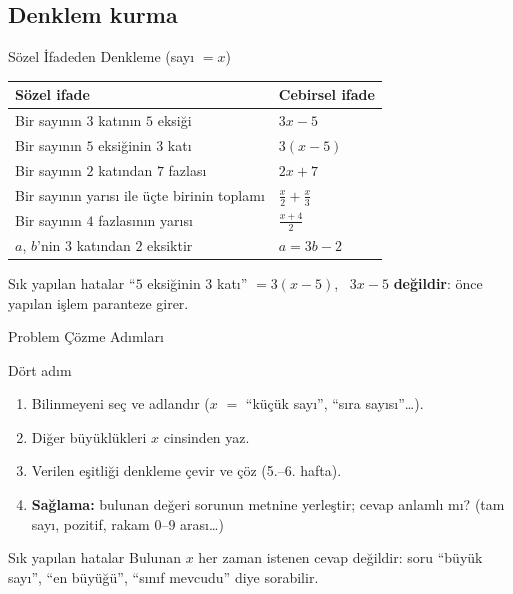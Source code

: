 \documentclass[aspectratio=169,11pt]{beamer}
\begin{document}
\subsection{Denklem kurma}
\begin{frame}{Sözel İfadeden Denkleme (sayı \(=x\))}
\begin{center}
\renewcommand{\arraystretch}{1.35}
\begin{tabular}{ll}
\toprule
Sözel ifade & Cebirsel ifade\\\midrule
Bir sayının \(3\) katının \(5\) eksiği & \(3x-5\)\\
Bir sayının \(5\) eksiğinin \(3\) katı & \(3(x-5)\)\\
Bir sayının \(2\) katından \(7\) fazlası & \(2x+7\)\\
Bir sayının yarısı ile üçte birinin toplamı & \(\tfrac{x}{2}+\tfrac{x}{3}\)\\
Bir sayının \(4\) fazlasının yarısı & \(\tfrac{x+4}{2}\)\\
\(a\), \(b\)'nin \(3\) katından \(2\) eksiktir & \(a=3b-2\)\\\bottomrule
\end{tabular}
\end{center}
\begin{alertblock}{Sık yapılan hatalar}
``\(5\) eksiğinin \(3\) katı'' \(=3(x-5)\), \ \(3x-5\) \textbf{değildir}: önce yapılan işlem paranteze girer.
\end{alertblock}
\end{frame}

\begin{frame}{Problem Çözme Adımları}
\begin{block}{Dört adım}
\begin{enumerate}
\item Bilinmeyeni seç ve adlandır (\(x\) \(=\) ``küçük sayı'', ``sıra sayısı''\dots).
\item Diğer büyüklükleri \(x\) cinsinden yaz.
\item Verilen eşitliği denkleme çevir ve çöz (5.--6. hafta).
\item \textbf{Sağlama:} bulunan değeri sorunun metnine yerleştir; cevap anlamlı mı? (tam sayı, pozitif, rakam \(0\)--\(9\) arası\dots)
\end{enumerate}
\end{block}
\begin{alertblock}{Sık yapılan hatalar}
Bulunan \(x\) her zaman istenen cevap değildir: soru ``büyük sayı'', ``en büyüğü'', ``sınıf mevcudu'' diye sorabilir.
\end{alertblock}
\end{frame}
\end{document}
